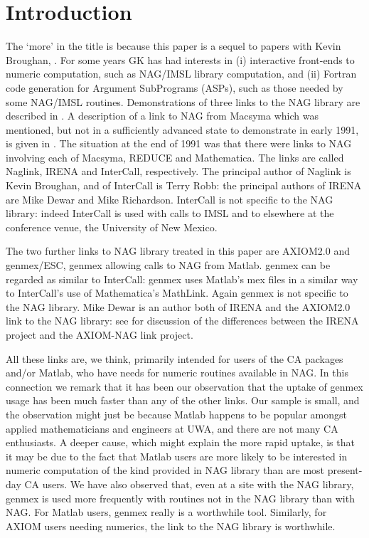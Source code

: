 \maketitle

\section*{Introduction}

The `more' in the title is because this paper is a sequel to 
papers with Kevin Broughan, \cite{BKRRD,BK}.
For some years GK has had interests in 
(i) interactive front-ends to numeric computation, such as NAG/IMSL
library computation, and
(ii) Fortran code generation for Argument SubPrograms (ASPs), 
such as those needed by some NAG/IMSL routines.
Demonstrations of three links to the NAG library
are described in \cite{BKRRD}.
A description of a link to NAG from Macsyma which was mentioned,
but not in a sufficiently advanced state to demonstrate
in early 1991, is given in \cite{BK}.
The situation at the end of 1991 was that there were links to NAG
involving each of Macsyma, REDUCE and Mathematica.
The links are called
Naglink, IRENA and InterCall, respectively.
The principal author of Naglink is Kevin Broughan, 
and of InterCall is Terry Robb:
the principal authors of IRENA are Mike Dewar and Mike Richardson.
InterCall is not specific to the NAG library:
indeed InterCall is used with calls to IMSL and to elsewhere
at the conference venue, the University of New Mexico.

The two further links to NAG library treated in this paper
are AXIOM2.0 and genmex/ESC, genmex allowing
calls to NAG from Matlab.
genmex can be regarded as similar to InterCall:
genmex uses Matlab's mex files in a similar way
to InterCall's use of Mathematica's MathLink.
Again genmex is not specific to the NAG library.
Mike Dewar is an author both of IRENA and
the AXIOM2.0 link to the NAG library:
see \cite{D} for discussion of the differences between
the IRENA project and the AXIOM-NAG link project.

All these links are, we think, primarily intended for users
of the CA packages and/or Matlab, who have needs for 
numeric routines available in NAG.
In this connection we remark that it has been our observation
that the uptake of genmex usage has been much faster than
any of the other links. 
Our sample is small, and the observation might just be because 
Matlab happens to be popular amongst applied mathematicians and
engineers at UWA, and there are not many CA enthusiasts.
A deeper cause, which might explain the more rapid uptake,
is that it may be due to the
fact that Matlab users are more likely to be interested in
numeric computation of the kind provided in NAG library
than are most present-day CA users.
We have also observed that, even at a site with the NAG library,
genmex is used more frequently with
routines not in the NAG library than with NAG.
For Matlab users, genmex really is a worthwhile tool.
Similarly, for AXIOM users needing numerics, the link to 
the NAG library is worthwhile.

